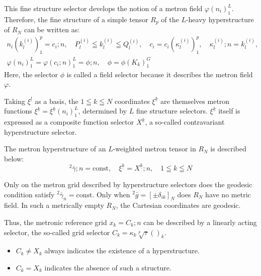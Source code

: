 \documentclass[11pt,a4paper,oneside]{article}
\begin{document}
This fine structure selector develops the notion of a metron field $\varphi(n_i)_1^L$. Therefore, the fine structure of a simple tensor $R_p$ of the $L$-heavy hyperstructure of $R_N$ can be written as:
\begin{equation}
    \begin{gathered}
    n_i(k_l^{(i)})_1^p = c_i; n, \quad P_l^{(i)}\leqq k_l^{(i)}\leqq Q_l^{(i)}, \quad c_i = c_i(\kappa_l^{(i)})_1^p, \quad \kappa_l^{(i)}; n = k_l^{(i)}, \\
    \varphi(n_i)_1^L = \varphi(c_i; n)_1^L = \phi; n, \quad \phi = \phi(K_k)^G_1
    \end{gathered} \tag {M18}
\end{equation}
Here, the selector $\phi$ is called a field selector because it describes the metron field $\varphi$.

Taking $\xi^{\underline{l}}$ as a basis, the $1 \leqq k \leqq N$ coordinates $\xi^{\underline{k}}$ are themselves metron functions $\xi^{\underline{k}} =\xi^{\underline{k}}(n_i)_1^L$, determined by $L$ fine structure selectors. $\xi^{\underline{k}}$ itself is expressed as a composite function selector $X^{\underline{k}}$, a so-called contravariant hyperstructure selector.

The metron hyperstructure of an $L$-weighted metron tensor in $R_N$ is described below:
\begin{equation}
    {}^2\bar {\gamma}; n = \text{const}, \quad \xi^{\underline{k}} = X^{\underline{k}}; n, \quad 1\leqq k\leqq N \tag {M18a}
\end{equation}

\begin{tcolorbox}[colback=white, colframe=theoryblue, title=\textbf{The Metron Grid Geodesic Condition}]
Only on the metron grid described by hyperstructure selectors does the geodesic condition satisfy ${}^2\bar{\gamma}_n = \text{const}$. Only when ${}^2\bar{g} = [\pm\delta_{ik}]_N$ does $R_N$ have no metric field. In such a metrically empty $R_N$, the Cartesian coordinates are geodesic.
\end{tcolorbox}

Thus, the metronic reference grid $x_k = C_k; n$ can be described by a linearly acting selector, the so-called grid selector $C_k = \kappa_k\sqrt [p] {\tau}()_k$.
\begin{itemize}
    \item $C_k \neq X_k$ always indicates the existence of a hyperstructure.
    \item $C_k = X_k$ indicates the absence of such a structure.
\end{itemize}
\end{document}
